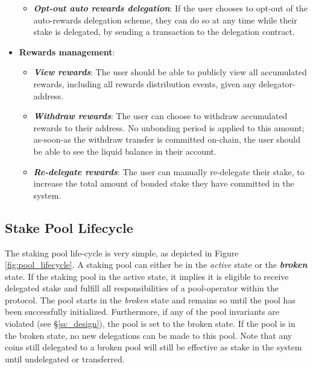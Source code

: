 \begin{itemize}
\begin{itemize}
        \item \textit{\textbf{Opt-out auto rewards delegation}}: If the user chooses to opt-out of the auto-rewards delegation scheme, they can do so at any time while their stake is delegated, by sending a transaction to the delegation contract.  
    \end{itemize}
    \item \textbf{Rewards management}: 
    \begin{itemize}
        \item \textit{\textbf{View rewards}}: The user should be able to publicly view all accumulated rewards, including all rewards distribution events, given any delegator-address.  
        \item \textit{\textbf{Withdraw rewards}}: The user can choose to withdraw accumulated rewards to their address. No unbonding period is applied to this amount; as-soon-as the withdraw transfer is committed on-chain, the user should be able to see the liquid balance in their account. 
        \item \textit{\textbf{Re-delegate rewards}}: The user can manually re-delegate their stake, to increase the total amount of bonded stake they have committed in the system.   
    \end{itemize}
\end{itemize}

\subsection{Stake Pool Lifecycle} \label{pool_lifecycle}

The staking pool life-cycle is very simple, as depicted in Figure \ref{fig:pool_lifecycle}. A staking pool can either be in the \textit{active} state or the \textbf{\textit{broken}} state. If the staking pool in the active state, it implies it is eligible to receive delegated stake and fulfill all responsibilities of a pool-operator within the protocol. The pool starts in the \textit{broken} state and remains so until the pool has been successfully initialized. Furthermore, if any of the pool invariants are violated (see \S\ref{sc_design}), the pool is set to the broken state. If the pool is in the broken state, no new delegations can be made to this pool. Note that any coins still delegated to a broken pool will still be effective as stake in the system until undelegated or transferred.  

